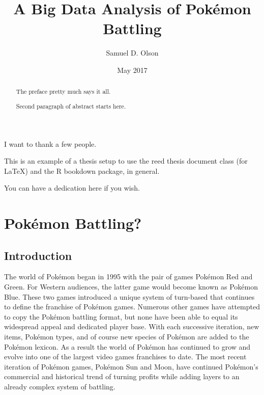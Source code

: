 \documentclass[12pt,twoside]{reedthesis}
\title{A Big Data Analysis of Pokémon Battling}
\author{Samuel D. Olson}
\date{May 2017}
\begin{document}
      \maketitle
  
  \frontmatter %
  \pagestyle{empty} %

      \begin{acknowledgements}
      I want to thank a few people.
    \end{acknowledgements}
  
      \begin{preface}
      This is an example of a thesis setup to use the reed thesis document
      class (for LaTeX) and the R bookdown package, in general.
    \end{preface}
  
      \hypersetup{linkcolor=black}
    \setcounter{tocdepth}{2}
    \tableofcontents
  
      \listoftables
  
      \listoffigures
  
      \begin{abstract}
      The preface pretty much says it all. \par  Second paragraph of abstract
      starts here.
    \end{abstract}
  
      \begin{dedication}
      You can have a dedication here if you wish.
    \end{dedication}
  
  \mainmatter %
  \pagestyle{fancyplain} %

  \chapter{Pokémon Battling?}\label{pokemon-battling}
  
  \section{Introduction}\label{introduction}
  
  The world of Pokémon began in 1995 with the pair of games Pokémon Red
  and Green. For Western audiences, the latter game would become known as
  Pokémon Blue. These two games introduced a unique system of turn-based
  that continues to define the franchise of Pokémon games. Numerous other
  games have attempted to copy the Pokémon battling format, but none have
  been able to equal its widespread appeal and dedicated player base. With
  each successive iteration, new items, Pokémon types, and of course new
  species of Pokémon are added to the Pokémon lexicon. As a result the
  world of Pokémon has continued to grow and evolve into one of the
  largest video games franchises to date. The most recent iteration of
  Pokémon games, Pokémon Sun and Moon, have continued Pokémon's commercial
  and historical trend of turning profits while adding layers to an
  already complex system of battling.
  
\end{document}
